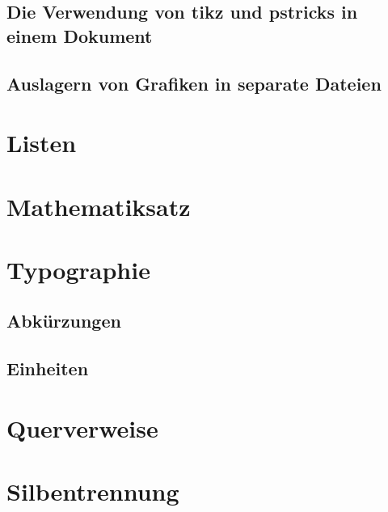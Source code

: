 \documentclass[%
  english,ngerman,%
  geometry=no,DIV=12,automark,%
]{tudscrartcl}
\begin{document}
\subsection{Die Verwendung von tikz und pstricks in einem Dokument}

\subsection{Auslagern von Grafiken in separate Dateien}

\section{Listen}


\section{Mathematiksatz}


\section{Typographie}

\subsection{Abkürzungen}

\subsection{Einheiten}


\section{Querverweise}


\section{Silbentrennung}
\end{document}
